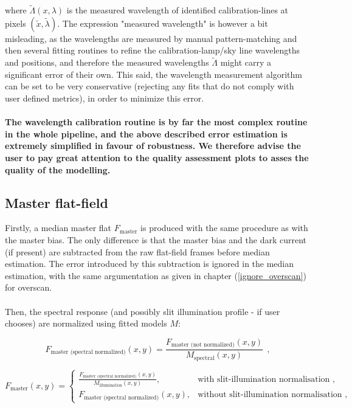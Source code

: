 \documentclass{article}
\begin{document}
\noindent where $\tilde{\Lambda}(x,\lambda)$ is the measured wavelength of identified calibration-lines at pixels $(\tilde{x},\tilde{\lambda})$. The expression "measured wavelength" is however a bit misleading, as the wavelengths are measured by manual pattern-matching and then several fitting routines to refine the calibration-lamp/sky line wavelengths and positions, and therefore the measured wavelengths $\tilde{\Lambda}$ might carry a significant error of their own. This said, the wavelength measurement algorithm can be set to be very conservative (rejecting any fits that do not comply with user defined metrics), in order to minimize this error.\\
\\
\textbf{The wavelength calibration routine is by far the most complex routine in the whole pipeline, and the above described error estimation is extremely simplified in favour of robustness. We therefore advise the user to pay great attention to the quality assessment plots to asses the quality of the modelling.}

\subsection{Master flat-field}\label{master-flat}

Firstly, a median master flat $F_{\text{master}}$ is produced with the same procedure as with the master bias. The only difference is that the master bias and the dark current (if present) are subtracted from the raw flat-field frames before median estimation. The error introduced by this subtraction is ignored in the median estimation, with the same argumentation as given in chapter (\ref{ignore_overscan}) for overscan.\\
\\
Then, the spectral response (and possibly slit illumination profile - if user chooses) are normalized using fitted models $M$: 

\begin{equation}\label{spectral_norm}
    F_{\text{master (spectral normalized)}}(x,y) = \frac{F_{\text{master (not normalized)}}(x,y)}{M_{\text{spectral}}(x,y)} \ \ ,
\end{equation}

\begin{equation}\label{spatial_norm}
    F_{\text{master}}(x,y) = 
    \begin{cases}
        \frac{F_{\text{master (spectral normalized)}}(x,y)}{M_{\text{illumination}}(x,y)}, & \text{with slit-illumination normalisation ,} \\
        F_{\text{master (spectral normalized)}}(x,y), & \text{without slit-illumination normalisation ,}
    \end{cases}
\end{equation}
\end{document}
